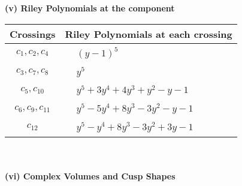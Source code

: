 \documentclass[1p]{elsarticle_modified}
\theoremstyle{definition}
\begin{document}
\newpage\renewcommand{\arraystretch}{1}
\flushleft \textbf{(v) Riley Polynomials at the component}\newline \\
\begin{tabular}{m{50pt}|m{274pt}}
Crossings & \hspace{64pt}Riley Polynomials at each crossing \\
\hline $$\begin{aligned}c_{1},c_{2},c_{4}\end{aligned}$$&$\begin{aligned}
&(y-1)^5
\end{aligned}$\\
\hline $$\begin{aligned}c_{3},c_{7},c_{8}\end{aligned}$$&$\begin{aligned}
&y^5
\end{aligned}$\\
\hline $$\begin{aligned}c_{5},c_{10}\end{aligned}$$&$\begin{aligned}
&y^5+3 y^4+4 y^3+y^2- y-1
\end{aligned}$\\
\hline $$\begin{aligned}c_{6},c_{9},c_{11}\end{aligned}$$&$\begin{aligned}
&y^5-5 y^4+8 y^3-3 y^2- y-1
\end{aligned}$\\
\hline $$\begin{aligned}c_{12}\end{aligned}$$&$\begin{aligned}
&y^5- y^4+8 y^3-3 y^2+3 y-1
\end{aligned}$\\
\hline
\end{tabular}\\~\\
\newpage\flushleft \textbf{(vi) Complex Volumes and Cusp Shapes}
\end{document}

